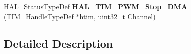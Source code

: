 \begin{DoxyCompactItemize}
\item 
\hypertarget{group___t_i_m___exported___functions___group3_gad77367f9b8d8d17842a913f7d6ce274b}{\hyperlink{stm32l1xx__hal__def_8h_a63c0679d1cb8b8c684fbb0632743478f}{H\-A\-L\-\_\-\-Status\-Type\-Def} {\bfseries H\-A\-L\-\_\-\-T\-I\-M\-\_\-\-P\-W\-M\-\_\-\-Stop\-\_\-\-D\-M\-A} (\hyperlink{struct_t_i_m___handle_type_def}{T\-I\-M\-\_\-\-Handle\-Type\-Def} $\ast$htim, uint32\-\_\-t Channel)}\label{group___t_i_m___exported___functions___group3_gad77367f9b8d8d17842a913f7d6ce274b}

\end{DoxyCompactItemize}


\subsection{Detailed Description}

